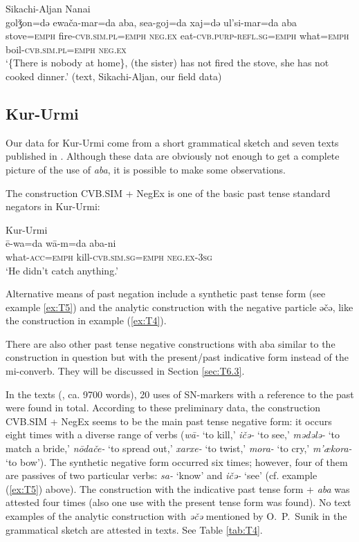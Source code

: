 \documentclass[output=paper]{langscibook}
\begin{document}
\ea Sikachi-Aljan Nanai \label{ex:T13}\\
	\gll golǯon=də	ewača-mar=da	aba, sea-goj=da	xaj=də	ul’si-mar=da	aba\\
	stove=\textsc{emph}	fire-\textsc{cvb.sim.pl=emph}	\textsc{neg.ex} eat-\textsc{cvb.purp-refl.sg=emph}	what=\textsc{emph}	boil-\textsc{cvb.sim.pl=emph}	\textsc{neg.ex}\\
	\glt `\{There is nobody at home\}, (the sister) has not fired the stove, she has not cooked dinner.' (text, Sikachi-Aljan, our field data)
\z

\subsection{Kur-Urmi}\label{sec:T5.3}

Our data for Kur-Urmi come from a short grammatical sketch and seven texts published in \citet{sunik1958a}. Although these data are obviously not enough to get a complete picture of the use of \textit{aba}, it is possible to make some observations.

The construction CVB.SIM + NegEx is one of the basic past tense standard negators in Kur-Urmi:

\ea Kur-Urmi \label{ex:T14}\\
	\gll ē-wa=da	wā-m=da	aba-ni\\
	what-\textsc{acc=emph}	kill-\textsc{cvb.sim.sg=emph}	\textsc{neg.ex-3sg}\\
	\glt `He didn’t catch anything.' \citep[134, text]{sunik1958a}
\z

Alternative means of past negation include a synthetic past tense form (see example \ref{ex:T5}) and the analytic construction with the negative particle əčə, like the construction in example (\ref{ex:T4}).

There are also other past tense negative constructions with aba similar to the construction in question but with the present/past indicative form instead of the mi-converb. They will be discussed in Section \ref{sec:T6.3}.

In the texts (\citealp{sunik1958a}, ca. 9700 words), 20 uses of SN-markers with a reference to the past were found in total. According to these preliminary data, the construction CVB.SIM + NegEx seems to be the main past tense negative form: it occurs eight times with a diverse range of verbs (\textit{wā-} ‘to kill,’ \textit{ičə-} ‘to see,’ \textit{mədələ-} ‘to match a bride,’ \textit{nōdače-} ‘to spread out,’ \textit{xarxe-} ‘to twist,’ \textit{mora-} ‘to cry,’ \textit{m’ækora-} ‘to bow’). The synthetic negative form occurred six times; however, four of them are passives of two particular verbs: \textit{sa-} ‘know’ and \textit{ičə-} ‘see’ (cf. example (\ref{ex:T5}) above). The construction with the indicative past tense form + \textit{aba} was attested four times (also one use with the present tense form was found). No text examples of the analytic construction with \textit{əčə} mentioned by O. P. Sunik in the grammatical sketch are attested in texts. See Table \ref{tab:T4}.
\end{document}
